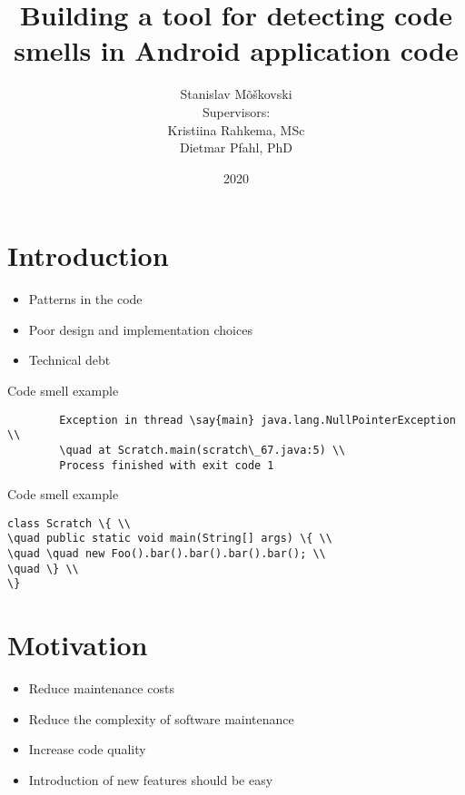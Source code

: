 \documentclass{beamer}
\title{Building a tool for detecting code smells in Android application code}
\author[Stanislav Mõškovski]{Stanislav Mõškovski\vspace{8mm} \\ {\small Supervisors: \\ Kristiina Rahkema, MSc \\Dietmar Pfahl, PhD}}
\institute{University of Tartu}
\date{2020}
\begin{document}
    \frame{\titlepage}

    \section{Introduction}\label{sec:introduction}
    \begin{frame}{\secname}
        \begin{itemize}
            \item Patterns in the code
            \item Poor design and implementation choices
            \item Technical debt
        \end{itemize}
    \end{frame}

    \begin{frame}{Code smell example}
        \begin{verbatim}
        Exception in thread \say{main} java.lang.NullPointerException \\
        \quad at Scratch.main(scratch\_67.java:5) \\
        Process finished with exit code 1
        \end{verbatim}
    \end{frame}

    \begin{frame}{Code smell example}
        \begin{verbatim}
class Scratch \{ \\
\quad public static void main(String[] args) \{ \\
\quad \quad new Foo().bar().bar().bar().bar(); \\
\quad \} \\
\}
        \end{verbatim}
    \end{frame}

    \section{Motivation}\label{sec:motivation}
    \begin{frame}{\secname}
        \begin{itemize}
            \item Reduce maintenance costs
            \item Reduce the complexity of software maintenance
            \item Increase code quality
            \item Introduction of new features should be easy
        \end{itemize}
    \end{frame}
\end{document}
